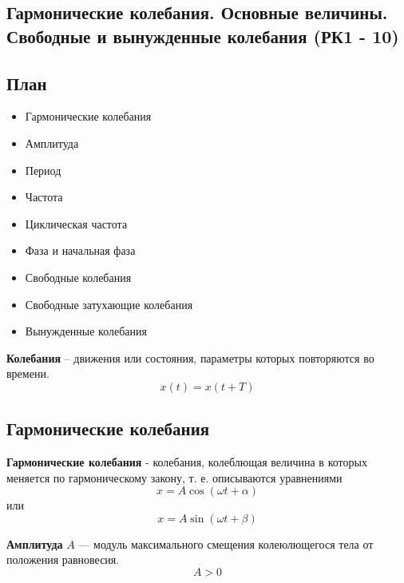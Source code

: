 \documentclass[a4paper,12pt]{article}
\begin{document}
\subsection{Гармонические колебания. Основные величины. Свободные и вынужденные колебания (РК1 - 10)}

\subsection*{План}
\begin{itemize}
\item Гармонические колебания
\item Амплитуда
\item Период
\item Частота
\item Циклическая частота
\item Фаза и начальная фаза
\item Свободные колебания
\item Свободные затухающие колебания
\item Вынужденные колебания
\end{itemize}

\vspace{0.8em}

\begin{definitionbox}
\textbf{Колебания} – движения или состояния, параметры которых повторяются во времени. 
\[
x(t) = x(t + T)
\]
\end{definitionbox}

\subsection*{Гармонические колебания}

\begin{definitionbox}
\textbf{Гармонические колебания} - колебания, колеблющая величина в которых меняется по гармоническому закону, т. е. описываются уравнениями
\[
x = A\cos(\omega t + \alpha)
\]
или
\[
x = A\sin(\omega t + \beta)
\]
\end{definitionbox}

\vspace{0.8em} 
\begin{definitionbox}
\textbf{Амплитуда} $A$ — модуль максимального смещения колеюлющегося тела от положения равновесия.
\[
A>0
\]
\end{definitionbox}

\vspace{0.8em}
 
\end{document}
